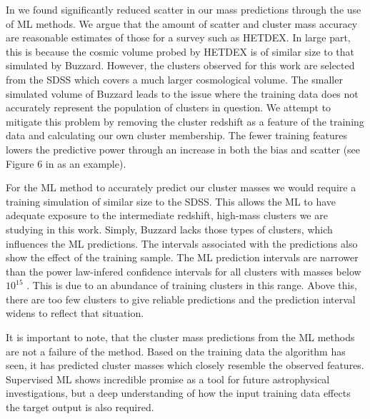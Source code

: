 In  we found significantly reduced scatter in our mass predictions through the use of ML methods. We argue that the amount of scatter and cluster mass accuracy are reasonable estimates of those for a survey such as HETDEX. In large part, this is because the cosmic volume probed by HETDEX is of similar size to that simulated by Buzzard. However, the clusters observed for this work are selected from the SDSS which covers a much larger cosmological volume. The smaller simulated volume of Buzzard leads to the issue where the training data does not accurately represent the population of clusters in question. We attempt to mitigate this problem by removing the cluster redshift as a feature of the training data and calculating our own cluster membership. The fewer training features lowers the predictive power through an increase in both the bias and scatter (see Figure 6 in  as an example). 

For the ML method to accurately predict our cluster masses we would require a training simulation of similar size to the SDSS. This allows the ML to have adequate exposure to the intermediate redshift, high-mass clusters we are studying in this work. Simply, Buzzard lacks those types of clusters, which influences the ML predictions. The intervals associated with the predictions also show the effect of the training sample. The ML prediction intervals are narrower than the power law-infered confidence intervals for all clusters with masses below $10^{15}$ \Msol. This is due to an abundance of training clusters in this range. Above this, there are too few clusters to give reliable predictions and the prediction interval widens to reflect that situation. 

It is important to note, that the cluster mass predictions from the ML methods are not a failure of the method. Based on the training data the algorithm has seen, it has predicted cluster masses which closely resemble the observed features. Supervised ML shows incredible promise as a tool for future astrophysical investigations, but a deep understanding of how the input training data effects the target output is also required.

